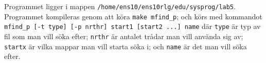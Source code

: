 Programmet ligger i mappen \texttt{/home/ens10/ens10rlg/edu/sysprog/lab5}.
Programmet kompileras genom att köra \texttt{make mfind\_p};
och körs med kommandot \texttt{mfind\_p [-t type] [-p nrthr] start1 [start2 ...] name} där \texttt{type} är typ av fil som man vill söka efter; \texttt{nrthr} är antalet trådar man vill använda sig av; \texttt{startx} är vilka mappar man vill starta söka i; och \texttt{name} är det man vill söka efter.